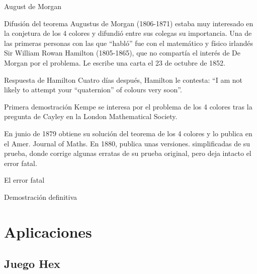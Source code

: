\documentclass[spanish,utf8]{beamer}
\theoremstyle{definition}
\begin{document}
\begin{frame}{\insertsection}\transblindsvertical
August de Morgan
\begin{block}{Difusión del teorema}
Augustus de Morgan (1806-1871) estaba muy interesado en la conjetura de los 4 colores y difundió entre sus colegas su importancia. Una de las primeras personas con las que ``habló'' fue con el matemático y físico irlandés Sir William Rowan Hamilton (1805-1865), que no compartía el interés de De Morgan por el problema. Le escribe una carta el 23 de octubre de 1852.
\end{block}

\begin{block}{Respuesta de Hamilton}
Cuatro días después, Hamilton le contesta: ``I am not likely to attempt your “quaternion” of colours very soon''.
\end{block}    
\end{frame}

\begin{frame}{\insertsection}\transblindsvertical
\begin{block}{Primera demostración}
Kempe se interesa por el problema de los 4 colores tras la pregunta de Cayley en la London Mathematical Society.
\end{block}

\begin{block}{}
En junio de 1879 obtiene su solución del teorema de los 4 colores y lo publica en el Amer. Journal of Maths. En 1880, publica unas versiones. simplificadas de su prueba, donde corrige algunas erratas de su prueba original, pero deja intacto el error fatal.
\end{block}
    \end{frame}

\begin{frame}{\insertsection}\transblindsvertical
El error fatal
\end{frame}

\begin{frame}{\insertsection}\transblindsvertical
Demostración definitiva
\end{frame}

\section{Aplicaciones}

\subsection{Juego Hex}
\end{document}
